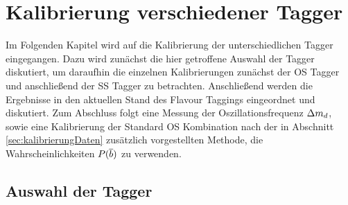 \chapter{Kalibrierung verschiedener Tagger}

Im Folgenden Kapitel wird auf die Kalibrierung der unterschiedlichen Tagger eingegangen. Dazu wird zunächst die hier getroffene Auswahl der Tagger diskutiert, um daraufhin die einzelnen Kalibrierungen zunächst der OS Tagger und anschließend der SS Tagger zu betrachten. Anschließend werden die Ergebnisse in den aktuellen Stand des Flavour Taggings eingeordnet und diskutiert.  Zum Abschluss folgt eine Messung der Oszillationsfrequenz ${\Delta m_{{d}}}$, sowie eine Kalibrierung der Standard OS Kombination nach der in Abschnitt \ref{sec:kalibrierungDaten} zusätzlich vorgestellten Methode, die Wahrscheinlichkeiten $P({\overline {{b}}})$ zu verwenden.

\section{Auswahl der Tagger}

